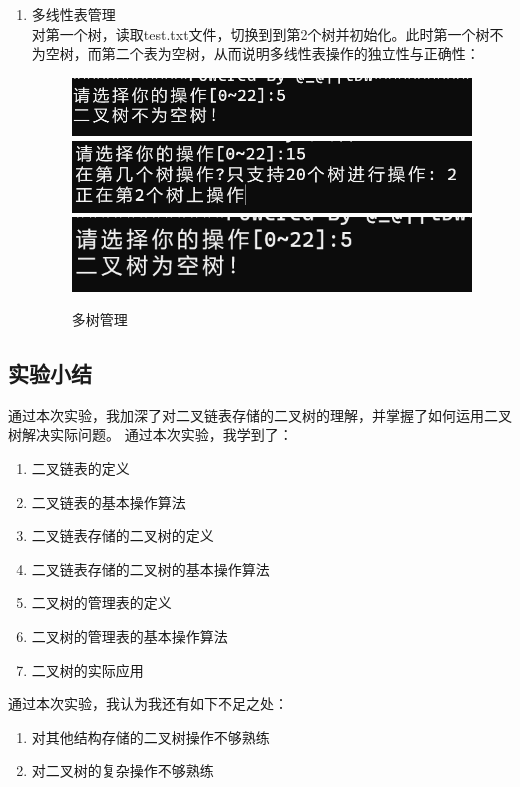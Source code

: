 \documentclass[supercite]{Experimental_Report}
\theoremstyle{definition}
\begin{document}
\begin{enumerate}
\item 多线性表管理\\
对第一个树，读取test.txt文件，切换到到第2个树并初始化。此时第一个树不为空树，而第二个表为空树，从而说明多线性表操作的独立性与正确性：
\begin{figure}[H]
	\centering
	\includegraphics[width=1\linewidth]{images/多树操作前.png}
	\includegraphics[width=1\linewidth]{images/多树切换.png}
	\includegraphics[width=1\linewidth]{images/多树操作成功.png}
	\caption{多树管理}
	\label{fig2-29}
\end{figure}

\end{enumerate}
\subsection{实验小结}
通过本次实验，我加深了对二叉链表存储的二叉树的理解，并掌握了如何运用二叉树解决实际问题。
通过本次实验，我学到了：
\begin{enumerate}
	\item 二叉链表的定义
    \item 二叉链表的基本操作算法
	\item 二叉链表存储的二叉树的定义
    \item 二叉链表存储的二叉树的基本操作算法
    \item 二叉树的管理表的定义
    \item 二叉树的管理表的基本操作算法
    \item 二叉树的实际应用
\end{enumerate}
通过本次实验，我认为我还有如下不足之处：
\begin{enumerate}
	\item 对其他结构存储的二叉树操作不够熟练
    \item 对二叉树的复杂操作不够熟练
\end{enumerate}
\newpage
\end{document}

